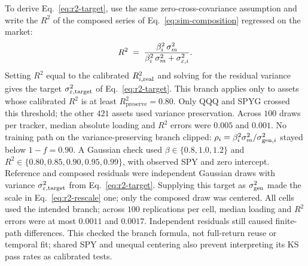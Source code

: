 To derive Eq.~\eqref{eq:r2-target}, use the same zero-cross-covariance
assumption and write the $R^2$ of the composed series of
Eq.~\eqref{eq:sim-composition} regressed on the market:
\begin{equation}
  R^2 \;=\; \frac{\beta_i^2\, \sigma_m^2}{\beta_i^2\, \sigma_m^2 + \sigma_{\varepsilon,i}^2}.
\end{equation}
Setting $R^2$ equal to the calibrated $R^2_{i,\mathrm{real}}$ and solving for
the residual variance gives the target $\sigma_{\varepsilon,\mathrm{target}}^2$
of Eq.~\eqref{eq:r2-target}. This branch applies only to assets whose
calibrated $R^2$ is at least $R^2_{\mathrm{preserve}} = 0.80$. Only QQQ and SPYG crossed this threshold; the other $421$ assets used variance preservation. Across $100$ draws per tracker, median absolute loading and $R^2$ errors were $0.005$ and $0.001$. No training path on the variance-preserving branch clipped: $\rho_i = \beta_i^2 \sigma_m^2 / \sigma_{\mathrm{gen},i}^2$ stayed below $1-f=0.90$.
A Gaussian check used $\beta\in\{0.8,1.0,1.2\}$ and $R^2\in\{0.80,0.85,0.90,0.95,0.99\}$, with observed SPY and zero intercept. Reference and composed residuals were independent Gaussian draws with variance $\sigma_{\varepsilon,\mathrm{target}}^2$ from Eq.~\eqref{eq:r2-target}. Supplying this target as $\sigma_{\mathrm{gen}}^2$ made the scale in Eq.~\eqref{eq:r2-rescale} one; only the composed draw was centered. All cells used the intended branch; across $100$ replications per cell, median loading and $R^2$ errors were at most $0.0011$ and $0.0017$. Independent residuals still caused finite-path differences. This checked the branch formula, not full-return reuse or temporal fit; shared SPY and unequal centering also prevent interpreting its KS pass rates as calibrated tests.

